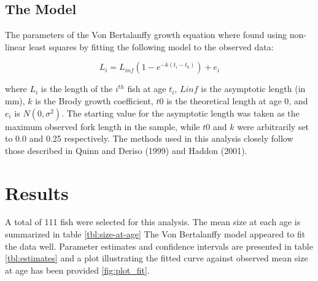\documentclass{article}\usepackage[]{graphicx}\usepackage[]{color}
\begin{document}
\subsection*{The Model}
\label{sub:the_model}

The parameters of the Von Bertalanffy growth equation where found using
non-linear least squares by fitting the following model to the
observed data:

\begin{equation}
L_i = L_{inf} (1 - e^{-k(t_i-t_0)}) + e_i
\end{equation}

where $L_i$ is the length of the $i^{th}$ fish at age $t_i$, $Linf$ is the
asymptotic length (in mm), $k$ is the Brody growth coefficient, $t0$
is the theoretical length at age 0, and $e_i$  is $N(0,\sigma ^2)$.
The starting value for the asymptotic length was taken as the maximum
observed fork length in the sample, while $t0$ and $k$ were arbitrarily
set to 0.0 and 0.25 respectively.  The methods used in this analysis
closely follow those described in Quinn and Deriso (1999) and Haddon
(2001).

\section*{Results}
\label{sec:results}

A total of 111 fish were selected for this analysis.
The mean size at each age is summarized in table \ref{tbl:size-at-age}
The Von Bertalanffy model appeared to fit the data well.  Parameter
estimates and confidence intervals are presented in table
\ref{tbl:estimates} and a plot illustrating the fitted curve against
observed mean size at age has been provided \ref{fig:plot_fit}.
\end{document}
